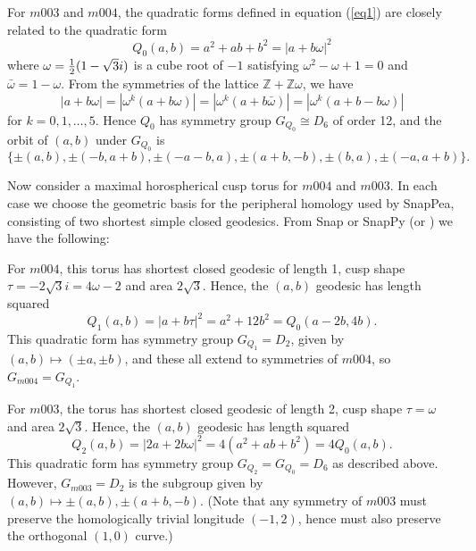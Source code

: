 \documentclass[reqno]{amsproc}  %
\def\Z{\mathbb{Z}}
\begin{document}
For $m003$ and $m004$, the quadratic forms defined in  equation (\ref{eq1}) are closely related to the quadratic form
\begin{equation}  \label{eq10}Q_0(a,b) = a^2+ab+b^2 = |a+b \omega|^2
 \end{equation} 
where $\omega = {1\over 2}(1-\sqrt{3} i )$ is a cube root of $-1$ satisfying
$\omega^2-\omega+1=0$ and $\bar \omega = 1-\omega$.
 From the symmetries of the lattice $\Z+\Z\omega$, we have
$$|a+b \omega| = | \omega^k(a+b \omega)| = | \omega^k(a+ b \bar \omega)| = | \omega^k(a+b-b \omega)|$$
for $k =0, 1, \ldots, 5$. Hence $Q_0$ has symmetry group $G_{Q_0} \cong D_6$ of order 12, and
the orbit of $(a,b)$ under $G_{Q_0}$ is
\begin{equation}  \label{eq11}\{ \pm(a,b), \pm(-b,a+b), \pm(-a-b,a), \pm (a+b,-b),\pm(b,a), \pm(-a,a+b) \}.
 \end{equation}

\medskip
Now consider a maximal horospherical cusp torus for $m004$ and $m003$.
In each case we choose the geometric basis for the peripheral homology used by SnapPea,
consisting of two shortest simple closed geodesics.
From Snap or SnapPy (or \cite{weeks_phd}) we have the following:

\smallskip
For $m004$, this torus has shortest closed geodesic of length 1,
cusp shape $\tau = -2 \sqrt{3}i = 4 \omega -2$ and area $2 \sqrt{3}$. 
Hence, the $(a,b)$ geodesic has length squared
\begin{equation}  \label{eq12}Q_1(a,b)= |a + b \tau|^2 = a^2 + 12 b^2 =Q_0(a-2b,4b) .
 \end{equation}
This quadratic form has symmetry group
$G_{Q_1} = D_2$, given by $(a,b) \mapsto (\pm a, \pm b)$,
and these all extend to symmetries of $m004$, so $G_{m004} = G_{Q_1}$.

\smallskip
For $m003$, the torus has shortest closed geodesic of length 2,
cusp shape $\tau = \omega$ and area $2 \sqrt{3}$. 
Hence, the $(a,b)$ geodesic has length squared
\begin{equation}  \label{eq13}Q_2(a,b)= |2a + 2b \omega|^2 = 4(a^2+ab+b^2) = 4Q_0(a,b) .
 \end{equation}
This quadratic form has symmetry group $G_{Q_2}=G_{Q_0} = D_6$
as described above. However, $G_{m003} = D_2$ is the subgroup
given by $(a,b) \mapsto \pm(a,b), \pm(a+b,-b)$. (Note that
any symmetry of $m003$ must preserve the homologically trivial longitude
$(-1,2)$, hence must also preserve the orthogonal $(1,0)$ curve.)
\end{document}
